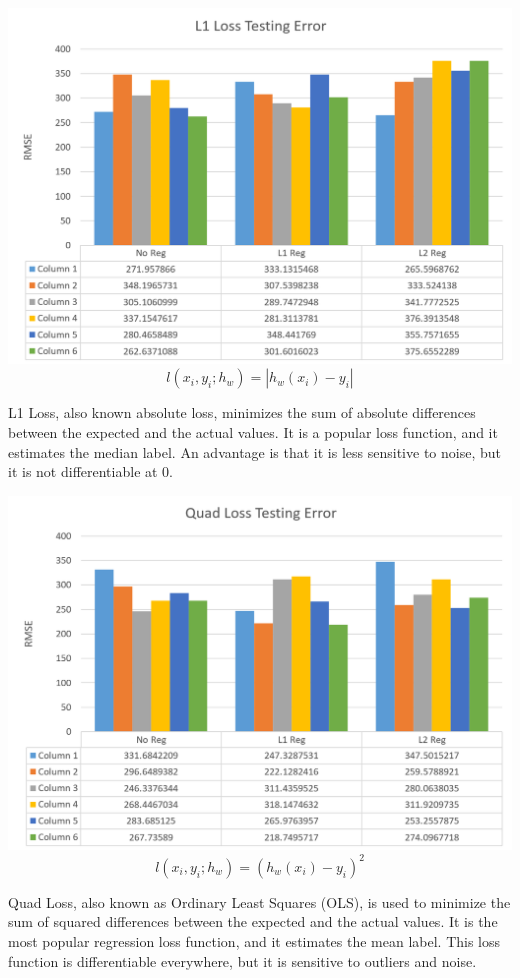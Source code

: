 \documentclass{article}
\begin{document}
\includegraphics[width=\textwidth]{L1Loss}
	\begin{equation}
    	l(x_i, y_i; h_w) = |h_w(x_i) - y_i|
    \end{equation}
    
L1 Loss, also known absolute loss, minimizes the sum of absolute differences between the expected and the actual values. It is a popular loss function, and it estimates the median label. An advantage is that it is less sensitive to noise, but it is not differentiable at 0.
    
\includegraphics[width=\textwidth]{QuadLoss}
	\begin{equation}
    	l(x_i, y_i; h_w) = (h_w(x_i) - y_i)^2
    \end{equation}
    
Quad Loss, also known as Ordinary Least Squares (OLS), is used to minimize the sum of squared differences between the expected and the actual values. It is the most popular regression loss function, and it estimates the mean label. This loss function is differentiable everywhere, but it is sensitive to outliers and noise.
\end{document}
